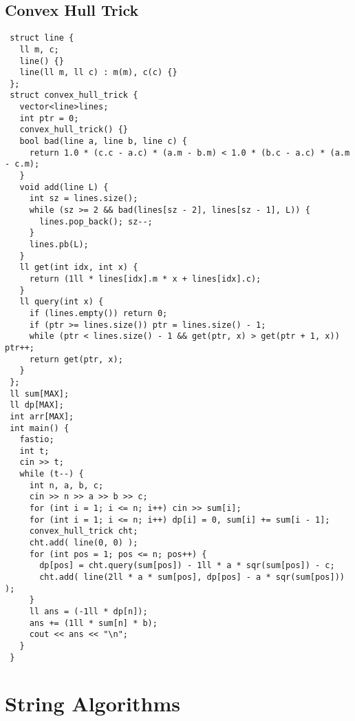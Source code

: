 \documentclass[10pt,a4paper,onesided]{article}
\begin{document}
\begin{multicols*}{3}
\subsection{Convex Hull Trick}
\begin{lstlisting}
 struct line {
   ll m, c;
   line() {}
   line(ll m, ll c) : m(m), c(c) {}
 };
 struct convex_hull_trick {
   vector<line>lines;
   int ptr = 0;
   convex_hull_trick() {}
   bool bad(line a, line b, line c) {
     return 1.0 * (c.c - a.c) * (a.m - b.m) < 1.0 * (b.c - a.c) * (a.m - c.m);
   }
   void add(line L) {
     int sz = lines.size();
     while (sz >= 2 && bad(lines[sz - 2], lines[sz - 1], L)) {
       lines.pop_back(); sz--;
     }
     lines.pb(L);
   }
   ll get(int idx, int x) {
     return (1ll * lines[idx].m * x + lines[idx].c);
   }
   ll query(int x) {
     if (lines.empty()) return 0;
     if (ptr >= lines.size()) ptr = lines.size() - 1;
     while (ptr < lines.size() - 1 && get(ptr, x) > get(ptr + 1, x)) ptr++;
     return get(ptr, x);
   }
 };
 ll sum[MAX];
 ll dp[MAX];
 int arr[MAX];
 int main() {
   fastio;
   int t;
   cin >> t;
   while (t--) {
     int n, a, b, c;
     cin >> n >> a >> b >> c;
     for (int i = 1; i <= n; i++) cin >> sum[i];
     for (int i = 1; i <= n; i++) dp[i] = 0, sum[i] += sum[i - 1];
     convex_hull_trick cht;
     cht.add( line(0, 0) );
     for (int pos = 1; pos <= n; pos++) {
       dp[pos] = cht.query(sum[pos]) - 1ll * a * sqr(sum[pos]) - c;
       cht.add( line(2ll * a * sum[pos], dp[pos] - a * sqr(sum[pos])) );
     }
     ll ans = (-1ll * dp[n]);
     ans += (1ll * sum[n] * b);
     cout << ans << "\n";
   }
 } 
\end{lstlisting}
\section{String Algorithms}

\end{multicols*}
\end{document}
